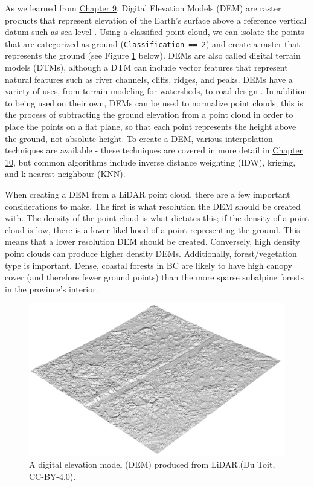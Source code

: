 \documentclass[
]{book}
\begin{document}
As we learned from \href{https://ubc-geomatics-textbook.github.io/geomatics-textbook/raster-analysis-and-terrain-modelling.html}{Chapter 9}, Digital Elevation Models (DEM) are raster products that represent elevation of the Earth's surface above a reference vertical datum such as sea level \citep{white_best_2013}. Using a classified point cloud, we can isolate the points that are categorized as ground (\texttt{Classification\ ==\ 2}) and create a raster that represents the ground (see Figure \ref{fig:15-las-dem} below). DEMs are also called digital terrain models (DTMs), although a DTM can include vector features that represent natural features such as river channels, cliffs, ridges, and peaks. DEMs have a variety of uses, from terrain modeling for watersheds, to road design \citep{roussel_lidr_2021}. In addition to being used on their own, DEMs can be used to normalize point clouds; this is the process of subtracting the ground elevation from a point cloud in order to place the points on a flat plane, so that each point represents the height above the ground, not absolute height. To create a DEM, various interpolation techniques are available - these techniques are covered in more detail in \href{https://ubc-geomatics-textbook.github.io/geomatics-textbook/spatial-estimation.html}{Chapter 10}, but common algorithms include inverse distance weighting (IDW), kriging, and k-nearest neighbour (KNN).

When creating a DEM from a LiDAR point cloud, there are a few important considerations to make. The first is what resolution the DEM should be created with. The density of the point cloud is what dictates this; if the density of a point cloud is low, there is a lower likelihood of a point representing the ground. This means that a lower resolution DEM should be created. Conversely, high density point clouds can produce higher density DEMs. Additionally, forest/vegetation type is important. Dense, coastal forests in BC are likely to have high canopy cover (and therefore fewer ground points) than the more sparse subalpine forests in the province's interior.

\begin{figure}
\includegraphics[width=0.7\linewidth]{images/15-las-dem} \caption{A digital elevation model (DEM) produced from LiDAR.(Du Toit, CC-BY-4.0).}\label{fig:15-las-dem}
\end{figure}
\end{document}
